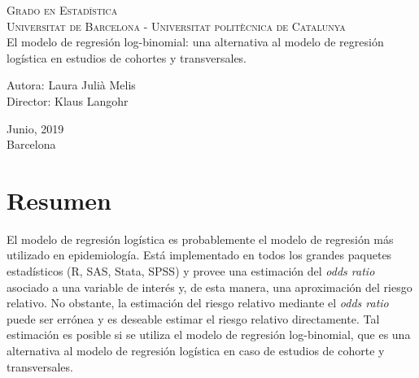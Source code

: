 \documentclass[twoside]{report}
\begin{document}
	

\shipout\null %

\begin{titlepage}
	\begin{center}
		\textsc{Grado en Estadística \\
			Universitat de Barcelona - Universitat politècnica de Catalunya}\\
		[3cm]
		
		\huge{El modelo de regresión log-binomial: una alternativa al modelo de regresión logística en estudios de cohortes y transversales.} \\
		[12.3cm]
	\end{center}
	
	\begin{flushleft}
		\hspace*{9.8cm}
		\textmd{Autora: Laura Julià Melis}\\
		\vspace*{0.08cm}
		\hspace*{9.8cm}
		\textmd{Director: Klaus Langohr}\\
		[1cm]
	\end{flushleft}
	
	\begin{center}
		\textmd{Junio, 2019} \\
		[0.1cm]
		\textmd{Barcelona}
	\end{center}
\end{titlepage}

\shipout\null %


\setcounter{page}{3}
\chapter*{Resumen}
El modelo de regresión logística es probablemente el modelo de regresión más utilizado en epidemiología. Está implementado en todos los grandes paquetes estadísticos (R, SAS, Stata, SPSS) y provee una estimación del \textit{odds ratio} asociado a una variable de interés y, de esta manera, una aproximación del riesgo relativo. No obstante, la estimación del riesgo relativo mediante el \textit{odds ratio} puede ser errónea y es deseable estimar el riesgo relativo directamente. Tal estimación es posible si se utiliza el modelo de regresión log-binomial, que es una alternativa al modelo de regresión logística en caso de estudios de cohorte y transversales.\\
\end{document}
